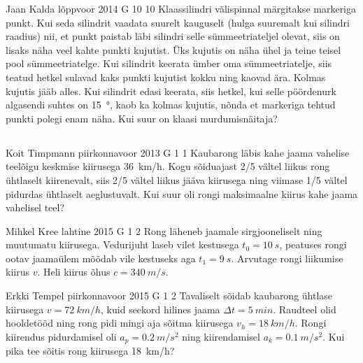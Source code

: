 \documentclass[11pt]{article}
\begin{document}
{%
{Jaan Kalda} %
{lõppvoor} %
{2014} %
{G 10} %
{10} %
{
\ifStatement
Klaassilindri välispinnal märgitakse markeriga punkt. Kui seda silindrit vaadata suurelt kauguselt (hulga suuremalt kui silindri raadius) nii, et punkt paistab läbi silindri selle sümmeetriateljel olevat, siis on lisaks näha veel kahte punkti kujutist. Üks kujutis on näha ühel ja teine teisel pool sümmeetriatelge. Kui silindrit keerata ümber oma sümmeetriatelje, siis teatud hetkel sulavad kaks punkti kujutist kokku ning kaovad ära. Kolmas kujutis jääb alles. Kui silindrit edasi keerata, siis hetkel, kui selle pöördenurk algasendi suhtes on \SI{15}{\degree}, kaob ka kolmas kujutis, nõnda et markeriga tehtud punkti polegi enam näha. Kui suur on klaasi murdumisnäitaja?
\fi
}
\newpage\subsection{\protect{}}

{Koit Timpmann} %
{piirkonnavoor} %
{2013} %
{G 1} %
{1} %
{
\ifStatement
Kaubarong läbis kahe jaama vahelise teelõigu keskmise kiirusega \SI{36}{km/h}.
Kogu sõiduajast 2/5 vältel liikus rong ühtlaselt kiirenevalt, siis 2/5 vältel
liikus jääva kiirusega ning viimase 1/5 vältel pidurdas ühtlaselt aeglustuvalt.
Kui suur oli rongi maksimaalne kiirus kahe jaama vahelisel teel?
\fi
}

{Mihkel Kree} %
{lahtine} %
{2015} %
{G 1} %
{2} %
{
\ifStatement
Rong läheneb jaamale sirgjooneliselt ning muutumatu kiirusega. Vedurijuht laseb vilet kestusega $t_0=\SI{10}{s}$, peatuses rongi ootav jaamaülem mõõdab vile kestuseks aga $t_1=\SI{9}{s}$. Arvutage rongi liikumise kiirus $v$. Heli kiirus õhus $c=\SI{340}{m/s}$.
\fi
}

{Erkki Tempel} %
{piirkonnavoor} %
{2015} %
{G 1} %
{2} %
{
\ifStatement
Tavaliselt sõidab kaubarong ühtlase kiirusega $v=\SI{72}{km/h}$, kuid seekord hilines jaama $\Delta t=\SI{5}{min}$. Raudteel olid hooldetööd ning rong pidi mingi aja sõitma kiirusega $v_{h}=\SI{18}{km/h}$. Rongi kiirendus pidurdamisel oli $a_p=\SI{0,2}{m/s^2}$ ning kiirendamisel $a_k=\SI{0,1}{m/s^2}$. Kui pika tee sõitis rong kiirusega \SI{18}{km/h}?
\fi
}

}
\end{document}
